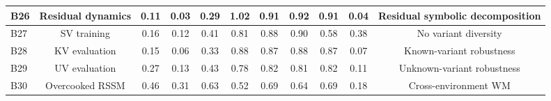 \begin{table}[h!]
{\begin{tabular}{lcccccccccc}
            B26                      &
            Residual dynamics        &
            \textbf{0.11}            &
            \textbf{0.03}            &
            \textbf{0.29}            &
            \textbf{1.02}            &
            \textbf{0.91}            &
            \textbf{0.92}            &
            \textbf{0.91}            &
            \textbf{0.04}            &
            Residual symbolic decomposition
            \\

            \midrule

            B27                      &
            SV training              &
            0.16                     &
            0.12                     &
            0.41                     &
            0.81                     &
            0.88                     &
            0.90                     &
            0.58                     &
            0.38                     &
            No variant diversity
            \\

            B28                      &
            KV evaluation            &
            0.15                     &
            0.06                     &
            0.33                     &
            0.88                     &
            0.87                     &
            0.88                     &
            0.87                     &
            0.07                     &
            Known-variant robustness
            \\

            B29                      &
            UV evaluation            &
            0.27                     &
            0.13                     &
            0.43                     &
            0.78                     &
            0.82                     &
            0.81                     &
            0.82                     &
            0.11                     &
            Unknown-variant robustness
            \\

            \midrule

            B30                      &
            Overcooked RSSM          &
            0.46                     &
            0.31                     &
            0.63                     &
            0.52                     &
            0.69                     &
            0.64                     &
            0.69                     &
            0.18                     &
            Cross-environment WM
            \\


\end{tabular}}
\end{table}
